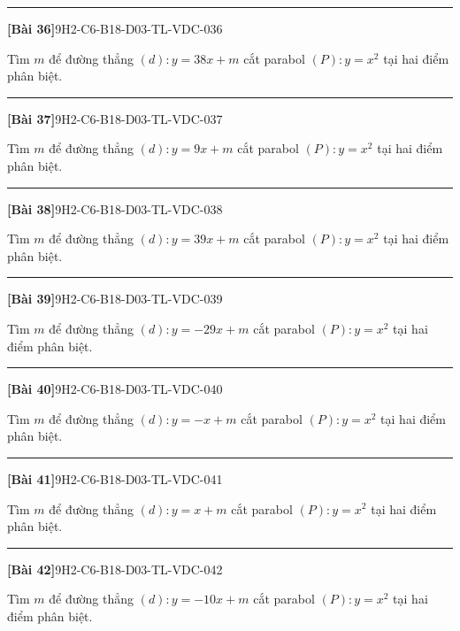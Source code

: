 \documentclass[12pt,a4paper]{article}
\newif\ifloigiai
\newenvironment{cauhoi}[2]{%
  \par\medskip\noindent\rule{\textwidth}{0.4pt}\par\nopagebreak
  \noindent\textbf{[#1]}\hfill{\scriptsize\ttfamily #2}\par\nopagebreak\smallskip}{\par}
\newcommand{\loigiai}[1]{\ifloigiai\par\smallskip\noindent\textit{Lời giải.} #1\par\fi}
\begin{document}
\begin{cauhoi}{Bài 36}{9H2-C6-B18-D03-TL-VDC-036}
Tìm $m$ để đường thẳng $(d): y=38x+m$ cắt parabol $(P): y=x^{2}$ tại hai điểm phân biệt.
\loigiai{Phương trình hoành độ giao điểm $x^{2}-38x-m=0$. Để $(d)$ cắt $(P)$ tại hai điểm phân biệt cần $\Delta=1444+4m>0$, suy ra $m>-361$.}
\end{cauhoi}
\begin{cauhoi}{Bài 37}{9H2-C6-B18-D03-TL-VDC-037}
Tìm $m$ để đường thẳng $(d): y=9x+m$ cắt parabol $(P): y=x^{2}$ tại hai điểm phân biệt.
\loigiai{Phương trình hoành độ giao điểm $x^{2}-9x-m=0$. Để $(d)$ cắt $(P)$ tại hai điểm phân biệt cần $\Delta=81+4m>0$, suy ra $m>-\dfrac{81}{4}$.}
\end{cauhoi}
\begin{cauhoi}{Bài 38}{9H2-C6-B18-D03-TL-VDC-038}
Tìm $m$ để đường thẳng $(d): y=39x+m$ cắt parabol $(P): y=x^{2}$ tại hai điểm phân biệt.
\loigiai{Phương trình hoành độ giao điểm $x^{2}-39x-m=0$. Để $(d)$ cắt $(P)$ tại hai điểm phân biệt cần $\Delta=1521+4m>0$, suy ra $m>-\dfrac{1521}{4}$.}
\end{cauhoi}
\begin{cauhoi}{Bài 39}{9H2-C6-B18-D03-TL-VDC-039}
Tìm $m$ để đường thẳng $(d): y=-29x+m$ cắt parabol $(P): y=x^{2}$ tại hai điểm phân biệt.
\loigiai{Phương trình hoành độ giao điểm $x^{2}+29x-m=0$. Để $(d)$ cắt $(P)$ tại hai điểm phân biệt cần $\Delta=841+4m>0$, suy ra $m>-\dfrac{841}{4}$.}
\end{cauhoi}
\begin{cauhoi}{Bài 40}{9H2-C6-B18-D03-TL-VDC-040}
Tìm $m$ để đường thẳng $(d): y=-x+m$ cắt parabol $(P): y=x^{2}$ tại hai điểm phân biệt.
\loigiai{Phương trình hoành độ giao điểm $x^{2}+x-m=0$. Để $(d)$ cắt $(P)$ tại hai điểm phân biệt cần $\Delta=1+4m>0$, suy ra $m>-\dfrac{1}{4}$.}
\end{cauhoi}
\begin{cauhoi}{Bài 41}{9H2-C6-B18-D03-TL-VDC-041}
Tìm $m$ để đường thẳng $(d): y=x+m$ cắt parabol $(P): y=x^{2}$ tại hai điểm phân biệt.
\loigiai{Phương trình hoành độ giao điểm $x^{2}-x-m=0$. Để $(d)$ cắt $(P)$ tại hai điểm phân biệt cần $\Delta=1+4m>0$, suy ra $m>-\dfrac{1}{4}$.}
\end{cauhoi}
\begin{cauhoi}{Bài 42}{9H2-C6-B18-D03-TL-VDC-042}
Tìm $m$ để đường thẳng $(d): y=-10x+m$ cắt parabol $(P): y=x^{2}$ tại hai điểm phân biệt.
\loigiai{Phương trình hoành độ giao điểm $x^{2}+10x-m=0$. Để $(d)$ cắt $(P)$ tại hai điểm phân biệt cần $\Delta=100+4m>0$, suy ra $m>-25$.}
\end{cauhoi}
\end{document}
